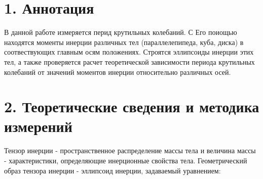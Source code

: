 \section* {1. Аннотация}

    В данной работе измеряется перид крутильных колебаний. С Его поиощью находятся моменты инерции различных тел (параллелепипеда, куба, диска) в соотвествующих главным осям положениях. Строятся эллипсоиды инерции этих тел, а также проверяется расчет теоретической зависимости периода крутильных колебаний от значений моментов инерции относительно различных осей.
    
\section* {2. Теоретические сведения и методика измерений}

    Тензор инерции - пространственное распределение массы тела и величина массы - характеристики, определяющие инерционные свойства тела. Геометрический образ тензора инерции - эллипсоид инерции, задаваемый уравнением:
    
